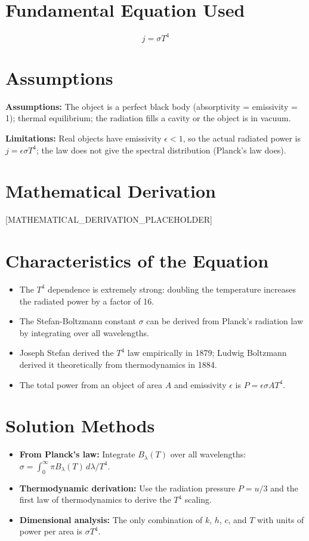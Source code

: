 \documentclass[11pt,openright]{book}
\begin{document}
\section*{Fundamental Equation Used}

\begin{equation}
j = \sigma T^4
\end{equation}
\section*{Assumptions}

\textbf{Assumptions:} The object is a perfect black body (absorptivity = emissivity = 1); thermal equilibrium; the radiation fills a cavity or the object is in vacuum.


\textbf{Limitations:} Real objects have emissivity $\epsilon < 1$, so the actual radiated power is $j = \epsilon\sigma T^4$; the law does not give the spectral distribution (Planck's law does).


\section*{Mathematical Derivation}

[MATHEMATICAL_DERIVATION_PLACEHOLDER]

\section*{Characteristics of the Equation}

\begin{itemize}
    \item The $T^4$ dependence is extremely strong: doubling the temperature increases the radiated power by a factor of 16.
    \item The Stefan-Boltzmann constant $\sigma$ can be derived from Planck's radiation law by integrating over all wavelengths.
    \item Joseph Stefan derived the $T^4$ law empirically in 1879; Ludwig Boltzmann derived it theoretically from thermodynamics in 1884.
    \item The total power from an object of area $A$ and emissivity $\epsilon$ is $P = \epsilon\sigma A T^4$.
\end{itemize}
\section*{Solution Methods}

\begin{itemize}
    \item \textbf{From Planck's law:} Integrate $B_\lambda(T)$ over all wavelengths: $\sigma = \int_0^\infty \pi B_\lambda(T)\,d\lambda / T^4$.
    \item \textbf{Thermodynamic derivation:} Use the radiation pressure $P = u/3$ and the first law of thermodynamics to derive the $T^4$ scaling.
    \item \textbf{Dimensional analysis:} The only combination of $k$, $h$, $c$, and $T$ with units of power per area is $\sigma T^4$.
\end{itemize}
\end{document}

